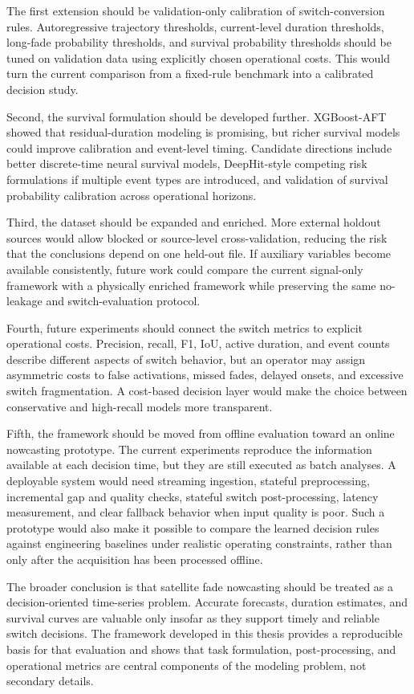 The first extension should be validation-only calibration of switch-conversion
rules. Autoregressive trajectory thresholds, current-level duration
thresholds, long-fade probability thresholds, and survival probability
thresholds should be tuned on validation data using explicitly chosen
operational costs. This would turn the current comparison from a fixed-rule
benchmark into a calibrated decision study.

Second, the survival formulation should be developed further. XGBoost-AFT
showed that residual-duration modeling is promising, but richer survival
models could improve calibration and event-level timing. Candidate directions
include better discrete-time neural survival models, DeepHit-style competing
risk formulations if multiple event types are introduced, and validation of
survival probability calibration across operational horizons.

Third, the dataset should be expanded and enriched. More external holdout
sources would allow blocked or source-level cross-validation, reducing the risk
that the conclusions depend on one held-out file. If auxiliary variables become
available consistently, future work could compare the current signal-only
framework with a physically enriched framework while preserving the same
no-leakage and switch-evaluation protocol.

Fourth, future experiments should connect the switch metrics to explicit
operational costs. Precision, recall, F1, IoU, active duration, and event
counts describe different aspects of switch behavior, but an operator may
assign asymmetric costs to false activations, missed fades, delayed onsets, and
excessive switch fragmentation. A cost-based decision layer would make the
choice between conservative and high-recall models more transparent.

Fifth, the framework should be moved from offline evaluation toward an online
nowcasting prototype. The current experiments reproduce the information
available at each decision time, but they are still executed as batch analyses.
A deployable system would need streaming ingestion, stateful preprocessing,
incremental gap and quality checks, stateful switch post-processing, latency
measurement, and clear fallback behavior when input quality is poor. Such a
prototype would also make it possible to compare the learned decision rules
against engineering baselines under realistic operating constraints, rather
than only after the acquisition has been processed offline.

The broader conclusion is that satellite fade nowcasting should be treated as a
decision-oriented time-series problem. Accurate forecasts, duration estimates,
and survival curves are valuable only insofar as they support timely and
reliable switch decisions. The framework developed in this thesis provides a
reproducible basis for that evaluation and shows that task formulation,
post-processing, and operational metrics are central components of the
modeling problem, not secondary details.
